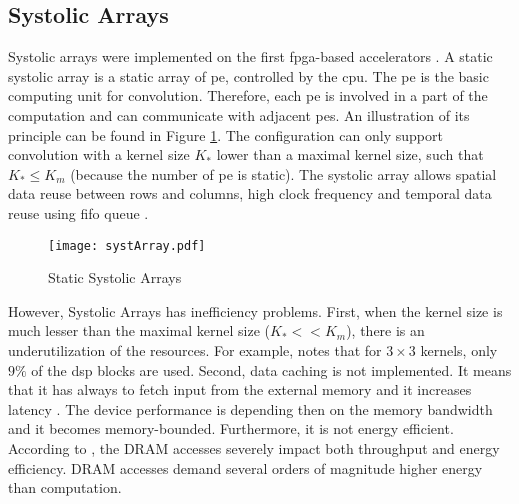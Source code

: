 \subsection{Systolic Arrays}
%
%
Systolic arrays were implemented on the first \acrshort{fpga}-based accelerators \cite{farabet_cnp_2009, gokhale_240_2014}. A static systolic array is a static array of \acrfull{pe}, controlled by the \acrshort{cpu}. The \acrshort{pe} is the basic computing unit for convolution. Therefore, each \acrshort{pe} is involved in a part of the computation and can communicate with adjacent \acrshort{pe}s. An illustration of its principle can be found in Figure \ref{fig:sytar}. The configuration can only support convolution with a kernel size $K_*$ lower than a maximal kernel size, such that $K_* \leq K_m$ (because the number of \acrshort{pe} is static). The systolic array allows spatial data reuse between rows and columns, high clock frequency and temporal data reuse using \acrshort{fifo} queue \cite{joos_de_ter_beerst_accelerating_2019, mittal_survey_2020}.
%
\begin{figure}
    \centering
    \texttt{[image: systArray.pdf]}
    \caption{Static Systolic Arrays}
    \label{fig:sytar}
\end{figure}

However, Systolic Arrays has inefficiency problems. First, when the kernel size is much lesser than the maximal kernel size ($K_* << K_m$), there is an underutilization of the resources. For example, \cite{gokhale_240_2014} notes that for $3 \times 3$ kernels, only $9\%$ of the \acrfull{dsp} blocks are used. Second, data caching is not implemented. It means that it has always to fetch input from the external memory and it increases latency \cite{wei_automated_2017, abdelouahab_accelerating_2018}. The device performance is depending then on the memory bandwidth and it becomes memory-bounded. Furthermore, it is not energy efficient. According to \textcite{horowitz_11_2014}, the DRAM accesses severely impact both throughput and energy efficiency. DRAM accesses demand several orders of magnitude higher energy than computation.
%
%
